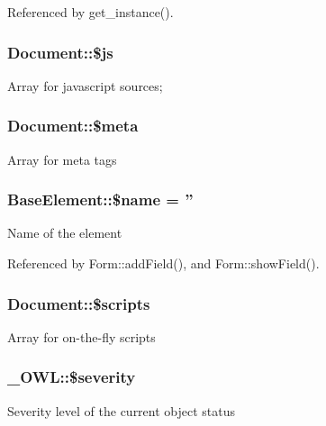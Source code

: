 Referenced by get\_\-instance().

\subsubsection[{\$js}]{\setlength{\rightskip}{0pt plus 5cm}Document::\$js}\label{classDocument_aff8d5c694d27719238793df5c3dbe55f}
Array for javascript sources; 
\subsubsection[{\$meta}]{\setlength{\rightskip}{0pt plus 5cm}Document::\$meta}\label{classDocument_a4b2a3fc78ec084611daef3343dca3756}
Array for meta tags 
\subsubsection[{\$name}]{\setlength{\rightskip}{0pt plus 5cm}BaseElement::\$name = ''}\label{classBaseElement_a30b8cff187a9de659a70daf287d66f45}
Name of the element 

Referenced by Form::addField(), and Form::showField().

\subsubsection[{\$scripts}]{\setlength{\rightskip}{0pt plus 5cm}Document::\$scripts}\label{classDocument_a011e1486a1c78776019df42ed652f6f0}
Array for on-\/the-\/fly scripts 
\subsubsection[{\$severity}]{\setlength{\rightskip}{0pt plus 5cm}\_\-OWL::\$severity}\label{class__OWL_ad26b40a9dbbacb33e299b17826f8327c}
Severity level of the current object status 
